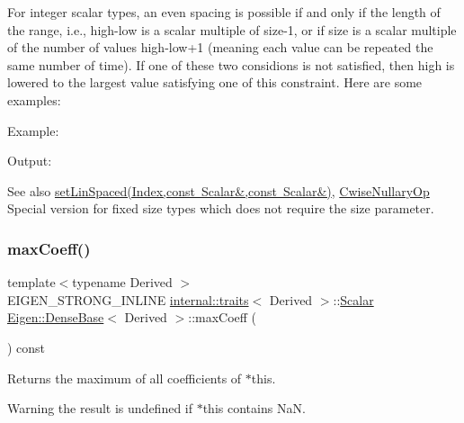 For integer scalar types, an even spacing is possible if and only if the length of the range, i.\+e., {\ttfamily high-\/low} is a scalar multiple of {\ttfamily size-\/1}, or if {\ttfamily size} is a scalar multiple of the number of values {\ttfamily high-\/low+1} (meaning each value can be repeated the same number of time). If one of these two considions is not satisfied, then {\ttfamily high} is lowered to the largest value satisfying one of this constraint. Here are some examples\+:

Example\+: 
\begin{DoxyCodeInclude}{0}
\end{DoxyCodeInclude}
 Output\+: 
\begin{DoxyVerbInclude}
\end{DoxyVerbInclude}


\begin{DoxySeeAlso}{See also}
\mbox{\hyperlink{class_eigen_1_1_dense_base_a17a69cfd1b44b64f26b1a0f00666a871}{set\+Lin\+Spaced(\+Index,const Scalar\&,const Scalar\&)}}, \mbox{\hyperlink{class_eigen_1_1_cwise_nullary_op}{Cwise\+Nullary\+Op}} Special version for fixed size types which does not require the size parameter. 
\end{DoxySeeAlso}
\mbox{\label{class_eigen_1_1_dense_base_ac0d151ec47eb7a44a3a5ba1587ddbeb4}} 
\subsubsection{\texorpdfstring{maxCoeff()}{maxCoeff()}\hspace{0.1cm}{\footnotesize\ttfamily [1/3]}}
{\footnotesize\ttfamily template$<$typename Derived $>$ \\
E\+I\+G\+E\+N\+\_\+\+S\+T\+R\+O\+N\+G\+\_\+\+I\+N\+L\+I\+NE \mbox{\hyperlink{struct_eigen_1_1internal_1_1traits}{internal\+::traits}}$<$ Derived $>$\+::\mbox{\hyperlink{class_eigen_1_1_dense_base_a5feed465b3a8e60c47e73ecce83e39a2}{Scalar}} \mbox{\hyperlink{class_eigen_1_1_dense_base}{Eigen\+::\+Dense\+Base}}$<$ Derived $>$\+::max\+Coeff (\begin{DoxyParamCaption}{ }\end{DoxyParamCaption}) const}

\begin{DoxyReturn}{Returns}
the maximum of all coefficients of {\ttfamily $\ast$this}. 
\end{DoxyReturn}
\begin{DoxyWarning}{Warning}
the result is undefined if {\ttfamily $\ast$this} contains NaN. 
\end{DoxyWarning}
\mbox{\label{class_eigen_1_1_dense_base_ab8318ab23b3d421b809fef0cb24f69e3}} 
